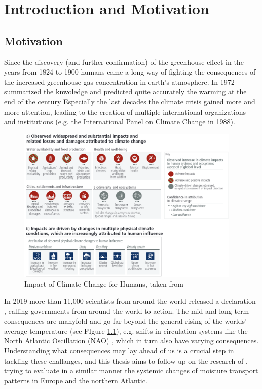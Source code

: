 \chapter{Introduction and Motivation}
\label{ch:intro}


\section{Motivation}
\label{sec:motivation}


Since the discovery (and further confirmation) of the greenhouse effect in the years from 1824 to 1900 \cite{fourier1824remarques, foote1856circumstances} humans came a long way of fighting the consequences of the increased greenhouse gas concentration in earth's atmosphere. 
In 1972 \citeauthor{sawyer1972man} summarized the knwoledge and predicted quite accurately the warming at the end of the century \cite{sawyer1972man}
Especially the last decades the climate crisis gained more and more attention, leading to the creation of multiple international organizations and institutions (e.g. the International Panel on Climate Change in 1988).


\begin{figure}[t]
  \begin{center}
    \includegraphics[width=0.95\textwidth]{figures/ipcc_6th_report_impacts_climate_change.png}
  \end{center}
  \caption{Impact of Climate Change for Humans, taken from \cite{lee2024climate}}
  \label{fig:impacts_climate_change}
\end{figure}



In 2019 more than 11,000  scientists from around the world released a declaration \cite{ripple_world_2019}, calling governments from around the world to action.
The mid and long-term consequences are manyfold and go far beyond the general rising of the worlds' average temperature (see FIgure \ref{fig:impacts_climate_change}), e.g. shifts in circulation systems like the North Atlantic Oscillation (NAO) \cite{vietinghoff_visual_2021}, which in turn also have varying consequences. 
Understanding what consequences may lay ahead of us is a crucial step in tackling these challanges, and this thesis aims to follow up on the research of \citeauthor{vietinghoff_visual_2021}, trying to evaluate in a similar manner the systemic changes of moisture transport patterns in Europe and the northern Atlantic. 


